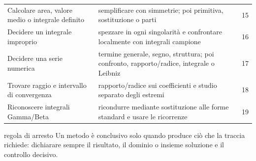 \begin{longtable}{@{}p{}p{}p{}@{}}
Calcolare area, valore medio o integrale definito & semplificare con simmetrie; poi primitiva, sostituzione o parti & 15\\
Decidere un integrale improprio & spezzare in ogni singolarità e confrontare localmente con integrali campione & 16\\
Decidere una serie numerica & termine generale, segno, struttura; poi confronto, rapporto/radice, integrale o Leibniz & 17\\
Trovare raggio e intervallo di convergenza & rapporto/radice sui coefficienti e studio separato degli estremi & 18\\
Riconoscere integrali Gamma/Beta & ricondurre mediante sostituzione alle forme standard e usare le ricorrenze & 19\\
\bottomrule
\end{longtable}

\begin{controllofinale}{regola di arresto}
Un metodo è conclusivo solo quando produce ciò che la traccia richiede: dichiarare sempre il risultato, il dominio o insieme soluzione e il controllo decisivo.
\end{controllofinale}
